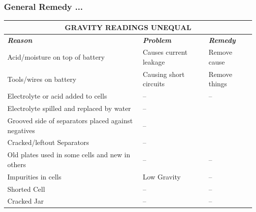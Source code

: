 \documentclass{beamer}
\begin{document}
\begin{frame}
  \frametitle{General Remedy ...}
  \fontsize{7.5pt}{10}\selectfont
  \renewcommand{\arraystretch}{1.3}
    \begin{tabularx}{\textwidth}{|X|X|X|}
    \hline
    \multicolumn{3}{|c|}{\textbf{GRAVITY READINGS UNEQUAL}} \\
    \hline
    \textbf{\textit{Reason}} & \textbf{\textit{Problem}} & \textbf{\textit{Remedy}} \\
    \hline
    Acid/moisture on top of battery & Causes current leakage & Remove cause \\ \hline
    Tools/wires on battery & Causing short circuits & Remove things  \\ \hline
    Electrolyte or acid added to cells & -- & --  \\ \hline
    Electrolyte spilled and replaced by water & -- &  \\ \hline
    Grooved side of separators placed against negatives & -- &  \\ \hline
    Cracked/leftout Separators & -- &  \\ \hline
    Old plates used in some cells and new in others & -- & --  \\ \hline
    Impurities in cells & Low Gravity & --  \\ \hline
    Shorted Cell & -- & -- \\ \hline
    Cracked Jar & -- & -- \\ \hline
    \end{tabularx}
\end{frame}
\end{document}
